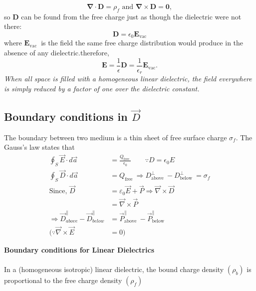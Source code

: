 $$\boldsymbol{\nabla} \cdot \mathbf{D}=\rho_{f}\text{ and }\boldsymbol{\nabla} \times \mathbf{D}=\mathbf{0},$$
so $\mathbf{D}$ can be found from the free charge just as though the dielectric were not there:
$$
\mathbf{D}=\epsilon_{0} \mathbf{E}_{\mathrm{vac}}
$$
where $\mathbf{E}_{\text {vac }}$ is the field the same free charge distribution would produce in the absence of any dielectric.therefore,
$$
\mathbf{E}=\frac{1}{\epsilon} \mathbf{D}=\frac{1}{\epsilon_{r}} \mathbf{E}_{\mathrm{vac}} .
$$
\textit{ When all space is filled with a homogeneous linear dielectric, the field everywhere is simply reduced by a factor of one over the dielectric constant.}
 \subsection{Boundary conditions in $\vec{D}$}
 The boundary between two medium is a
 thin sheet of free surface charge $\sigma_{f}$.
 The Gauss's law states that
  \begin{align*}
  \oint_{S} \vec{E}\cdot d \vec{a}&=\frac{Q_{\text {free }}}{\epsilon_{0}} \qquad \because D= {\epsilon_{0}}E\\
  \oint_{S} \vec{D}\cdot d \vec{a}&=Q_{\text {free }} \Rightarrow D_{\text {above }}^{\perp}-D_{\text {below }}^{\perp}=\sigma_{f}\\
 \text{Since, }
 \vec{D}&=\varepsilon_{0} \vec{E}+\vec{P} \Rightarrow \vec{\nabla} \times \vec{D}\\&=\vec{\nabla} \times \vec{P}\\
 \Rightarrow \vec{D}_{a b o v e}^{\|}-\vec{D}_{b e l o w}^{\|}&=\vec{P}_{\text {above }}^{\|}-\vec{P}_{\text {below }}^{\|} \\
 (\because \vec{\nabla} \times \vec{E}&=0)
 \end{align*}
 \begin{center}
 \end{center}
\textbf{Boundary conditions for Linear Dielectrics}\\\\
In a (homogeneous isotropic) linear dielectric, the bound charge density $\left(\rho_{b}\right)$ is proportional to the free charge density $\left(\rho_{f}\right)$
